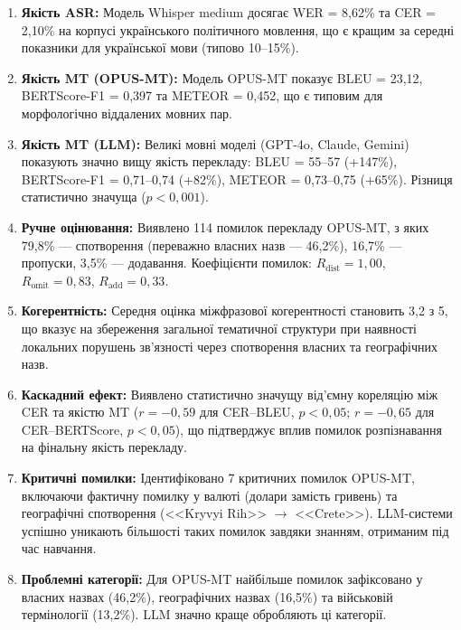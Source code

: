 \begin{enumerate}
    \item \textbf{Якість ASR:} Модель Whisper medium досягає WER = 8,62\%
    та CER = 2,10\% на корпусі українського політичного мовлення, що є
    кращим за середні показники для української мови (типово 10--15\%).

    \item \textbf{Якість MT (OPUS-MT):} Модель OPUS-MT показує BLEU = 23,12,
    BERTScore-F1 = 0,397 та METEOR = 0,452, що є типовим для
    морфологічно віддалених мовних пар.

    \item \textbf{Якість MT (LLM):} Великі мовні моделі (GPT-4o, Claude, Gemini)
    показують значно вищу якість перекладу: BLEU = 55--57 (+147\%),
    BERTScore-F1 = 0,71--0,74 (+82\%), METEOR = 0,73--0,75 (+65\%).
    Різниця статистично значуща ($p < 0,001$).

    \item \textbf{Ручне оцінювання:} Виявлено 114 помилок перекладу OPUS-MT, з яких
    79,8\% --- спотворення (переважно власних назв --- 46,2\%), 16,7\% ---
    пропуски, 3,5\% --- додавання. Коефіцієнти помилок: $R_{\text{dist}} = 1,00$,
    $R_{\text{omit}} = 0,83$, $R_{\text{add}} = 0,33$.

    \item \textbf{Когерентність:} Середня оцінка міжфразової когерентності
    становить 3,2 з 5, що вказує на збереження загальної тематичної
    структури при наявності локальних порушень зв'язності через спотворення
    власних та географічних назв.

    \item \textbf{Каскадний ефект:} Виявлено статистично значущу від'ємну
    кореляцію між CER та якістю MT ($r = -0,59$ для CER--BLEU, $p < 0,05$;
    $r = -0,65$ для CER--BERTScore, $p < 0,05$), що підтверджує вплив
    помилок розпізнавання на фінальну якість перекладу.

    \item \textbf{Критичні помилки:} Ідентифіковано 7 критичних помилок OPUS-MT,
    включаючи фактичну помилку у валюті (долари замість гривень) та
    географічні спотворення (<<Kryvyi Rih>> $\rightarrow$ <<Crete>>).
    LLM-системи успішно уникають більшості таких помилок завдяки
    знанням, отриманим під час навчання.

    \item \textbf{Проблемні категорії:} Для OPUS-MT найбільше помилок зафіксовано у
    власних назвах (46,2\%), географічних назвах (16,5\%) та військовій
    термінології (13,2\%). LLM значно краще обробляють ці категорії.
\end{enumerate}

\clearpage
